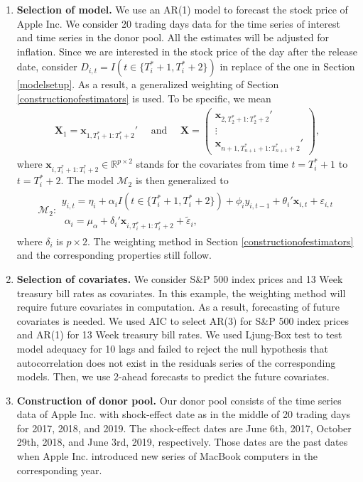 \documentclass[11pt,3p,review,authoryear]{elsarticle}
\def\mbf#1{\mathbf{#1}} %
\newcommand{\reals}{\mathbb{R}} %
\def\t#1{\tilde{#1}} %
\def\mc#1{\mathcal{#1}} %
\theoremstyle{definition}
\begin{document}
\begin{enumerate}[label = (\arabic*)]
  \item \textbf{Selection of model.}  We use an AR(1) model to forecast the stock price of Apple Inc. We consider 20 trading days data for the time series of interest and time series in the donor pool. All the estimates will be adjusted for inflation. Since we are interested in the stock price of the day after the release date, consider $D_{i, t} = I(t \in \{T_i^* +1, T_i^*+2\})$ in replace of the one in Section \ref{modelsetup}. As a result, a generalized weighting of Section \ref{constructionofestimators} is used. To be specific, we mean 
  \begin{align*}
    \mathbf{X}_1 = \mathbf{x}_{1,T_1^*+1: T_1^*+2}' \quad \text{ and } \quad 
    \mathbf{X}= \begin{pmatrix}
      \mathbf{x}_{2,T_2^*+1: T_2^*+2}' \\ \vdots \\ \mathbf{x}_{n+1,T_{n+1}^*+1: T_{n+1}^*+2}'
    \end{pmatrix},
  \end{align*}
  where $ \mathbf{x}_{i,T_i^*+1: T_i^*+2}\in \reals^{p \times 2}$ stands for the covariates from time $t = T_i^* +1$ to $t = T_i^*+2$. The model $\mc{M}_2$ is then generalized to 
  \begin{align*}
    \mc{M}_2 \colon \begin{array}{l}
  y_{i,t} =\eta_i +\alpha_i  I(t \in \{T_i^* +1, T_i^*+2\}) + \phi_i y_{i, t-1} + \theta_i'\mbf{x}_{i,t} + \varepsilon_{i,t}\\[.2cm]
  \; \alpha_i = \mu_{\alpha}+\delta_{i}'\mbf{x}_{i, T_i^*+1:T_i^*+2}+ \t{\varepsilon}_{i},
\end{array}
  \end{align*}
  where $\delta_i$ is $p \times 2$. The weighting method in Section \ref{constructionofestimators} and the corresponding properties  still follow.
  \item \textbf{Selection of covariates.} We consider   S\&P 500 index prices and 13 Week treasury bill rates as covariates. In this example, the weighting method will require future covariates in computation. As a result, forecasting of future covariates is needed. We used AIC to select AR(3) for S\&P 500 index prices and AR(1)  for 13 Week treasury bill rates. We used Ljung-Box test to test  model adequacy for 10 lags and failed to reject the null hypothesis that autocorrelation does not exist in the residuals series of the corresponding models. Then, we use 2-ahead forecasts to predict the future covariates.
  \item \textbf{Construction of donor pool.} Our donor pool consists of the time series data of Apple Inc. with shock-effect date as  in the middle of 20 trading days for 2017, 2018, and 2019.  The shock-effect dates are June 6th, 2017, October 29th, 2018, and June 3rd, 2019, respectively. Those dates are the past dates when Apple Inc. introduced new series of MacBook computers in the corresponding year.
\end{enumerate}
\end{document}
